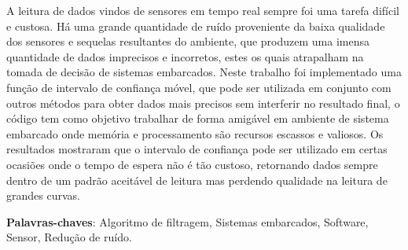 \setlength{\absparsep}{18pt} %
\begin{resumo}
	A leitura de dados vindos de sensores em tempo real sempre foi uma tarefa difícil e custosa. Há uma grande quantidade de ruído proveniente da baixa qualidade dos sensores e sequelas resultantes do ambiente, que produzem uma imensa quantidade de dados imprecisos e incorretos, estes os quais atrapalham na tomada de decisão de sistemas embarcados. 
	Neste trabalho foi implementado uma função de intervalo de confiança móvel, que pode ser utilizada em conjunto com outros métodos para obter dados mais precisos sem interferir no resultado final, o código tem como objetivo trabalhar de forma amigável em ambiente de sistema embarcado onde memória e processamento são recursos escassos e valiosos. Os resultados mostraram que o intervalo de confiança pode ser utilizado em certas ocasiões onde o tempo de espera não é tão custoso, retornando dados sempre dentro de um padrão aceitável de leitura mas perdendo qualidade na leitura de grandes curvas.


	



	\textbf{Palavras-chaves}: Algoritmo de filtragem, Sistemas embarcados, Software, Sensor, Redução de ruído.
\end{resumo}

